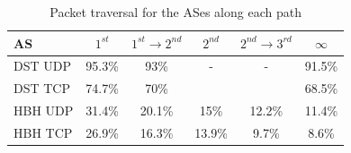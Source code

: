 \documentclass[conference]{IEEEtran}
\begin{document}
\begin{table}
\centering
\caption{Packet traversal for the ASes along each path}

\begin{tabular}{l|c|c|c|c|c}
   AS     & $1^{st}$  & $1^{st}\rightarrow 2^{nd}$   & $2^{nd}$  & $2^{nd} \rightarrow 3^{rd}$ &   $\infty$ \\ 
\hline \hline
DST UDP  & 95.3\%   & 93\%     &   -       &   -       & 91.5\%  \\
DST TCP  & 74.7\%   & 70\%     &          &          & 68.5\%  \\\hline
HBH UDP   & 31.4\%   & 20.1\%   & 15\%     & 12.2\%   & 11.4\%  \\ 
HBH TCP   & 26.9\%   & 16.3\%   & 13.9\%   & 9.7\%    & 8.6\%   \\ 
\end{tabular}
\label{tbl:uk_as1}

%
%
\end{table}





\end{document}
